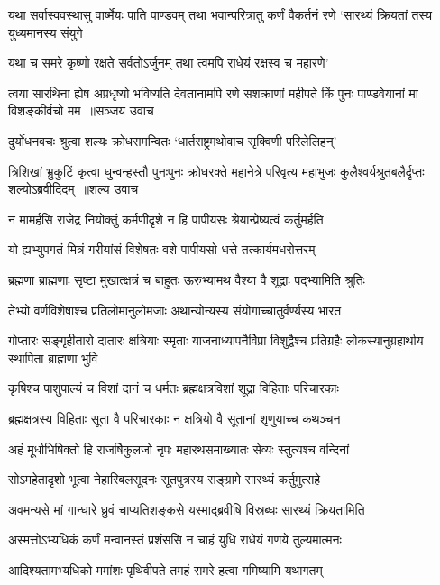 \threelineshloka
{यथा सर्वास्ववस्थासु वार्ष्मेयः पाति पाण्डवम्}
{तथा भवान्परित्रातु कर्णं वैकर्तनं रणे}
{`सारथ्यं क्रियतां तस्य युध्यमानस्य संयुगे}


\twolineshloka
{यथा च समरे कृष्णो रक्षते सर्वतोऽर्जुनम्}
{तथा त्वमपि राधेयं रक्षस्व च महारणे'}


\fourlineindentedshloka
{त्वया सारथिना ह्येष अप्रधृष्यो भविष्यति}
{देवतानामपि रणे सशक्राणां महीपते}
{किं पुनः पाण्डवेयानां मा विशङ्कीर्वचो मम ॥सञ्जय उवाच}
{}


\twolineshloka
{दुर्योधनवचः श्रुत्वा शल्यः क्रोधसमन्वितः}
{`धार्तराष्ट्रमथोवाच सृक्विणी परिलेलिहन्'}


\fourlineindentedshloka
{त्रिशिखां भ्रुकुटिं कृत्वा धुन्वन्हस्तौ पुनःपुनः}
{क्रोधरक्ते महानेत्रे परिवृत्य महाभुजः}
{कुलैश्वर्यश्रुतबलैर्दृप्तः शल्योऽब्रवीदिदम् ॥शल्य उवाच}
{}


\twolineshloka
{न मामर्हसि राजेद्र नियोक्तुं कर्मणीदृशे}
{न हि पापीयसः श्रेयान्प्रेष्यत्वं कर्तुमर्हति}


\twolineshloka
{यो ह्यभ्युपगतं मित्रं गरीयांसं विशेषतः}
{वशे पापीयसो धत्ते तत्कार्यमधरोत्तरम्}


\twolineshloka
{ब्रह्मणा ब्राह्मणाः सृष्टा मुखात्क्षत्रं च बाहुतः}
{ऊरुभ्यामथ वैश्या वै शूद्राः पद्भ्यामिति श्रुतिः}


\twolineshloka
{तेभ्यो वर्णविशेषाश्च प्रतिलोमानुलोमजाः}
{अथान्योन्यस्य संयोगाच्चातुर्वर्ण्यस्य भारत}


गोप्तारः सङ्गृहीतारो दातारः क्षत्रियाः स्मृताः
\twolineshloka
{याजनाध्यापनैर्विप्रा विशुद्वैश्च प्रतिग्रहैः}
{लोकस्यानुग्रहार्थाय स्थापिता ब्राह्मणा भुवि}


\twolineshloka
{कृषिश्च पाशुपाल्यं च विशां दानं च धर्मतः}
{ब्रह्मक्षत्रविशां शूद्रा विहिताः परिचारकाः}


\twolineshloka
{ब्रह्मक्षत्रस्य विहिताः सूता वै परिचारकाः}
{न क्षत्रियो वै सूतानां शृणुयाच्च कथञ्चन}


\twolineshloka
{अहं मूर्धाभिषिक्तो हि राजर्षिकुलजो नृपः}
{महारथसमाख्यातः सेव्यः स्तुत्यश्च वन्दिनां}


\twolineshloka
{सोऽमहेतादृशो भूत्वा नेहारिबलसूदनः}
{सूतपुत्रस्य सङ्ग्रामे सारथ्यं कर्तुमुत्सहे}


\twolineshloka
{अवमन्यसे मां गान्धारे ध्रुवं चाप्यतिशङ्कसे}
{यस्माद्ब्रवीषि विस्रब्धः सारथ्यं क्रियतामिति}


\twolineshloka
{अस्मत्तोऽभ्यधिकं कर्णं मन्वानस्तं प्रशंससि}
{न चाहं युधि राधेयं गणये तुल्यमात्मनः}


\twolineshloka
{आदिश्यतामभ्यधिको ममांशः पृथिवीपते}
{तमहं समरे हत्वा गमिष्यामि यथागतम्}


